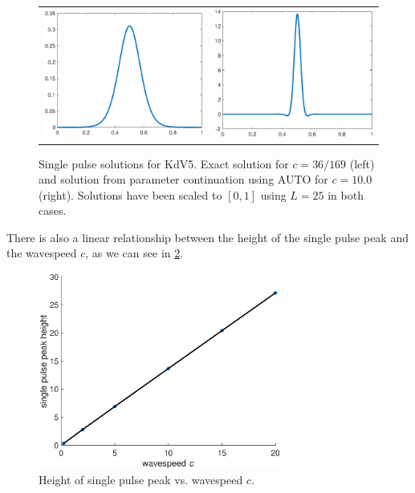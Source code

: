 \documentclass[thesis.tex]{subfiles}
\begin{document}
\begin{figure}
\begin{center}
\begin{tabular}{cc}
\includegraphics[width=8cm]{images/kdv5numerics/singleexact.eps} &
\includegraphics[width=8cm]{images/kdv5numerics/single10}
\end{tabular}
\caption{Single pulse solutions for KdV5. Exact solution for $c = 36/169$ (left) and solution from parameter continuation using AUTO for $c = 10.0$ (right). Solutions have been scaled to $[0, 1]$ using $L = 25$ in both cases.}
\label{fig:KdV5singlepulse}
\end{center}
\end{figure}

There is also a linear relationship between the height of the single pulse peak and the wavespeed $c$, as we can see in \cref{fig:KdV5peakht}.

\begin{figure}
\begin{center}
\includegraphics[width=8cm]{images/kdv5numerics/peakheightvsc}
\caption{Height of single pulse peak vs. wavespeed $c$.}
\label{fig:KdV5peakht}
\end{center}
\end{figure}
\end{document}
